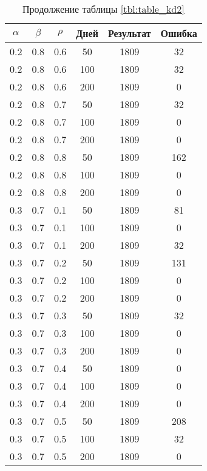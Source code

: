 \begin{table}[h]
	\begin{center}
        \begin{threeparttable}
        \captionsetup{justification=raggedright,singlelinecheck=off}
		\caption*{Продолжение таблицы \ref{tbl:table_kd2}}
		\begin{tabular}{|c|c|c|c|c|c|}
  	\hline
	$\alpha$ & $\beta$ & $\rho$ & Дней & Результат & Ошибка \\\hline
		0.2 &  0.8 &  0.6 &   50 &  1809 &    32 \\
		0.2 &  0.8 &  0.6 &  100 &  1809 &    32 \\
		0.2 &  0.8 &  0.6 &  200 &  1809 &     0 \\
	   \hline
		0.2 &  0.8 &  0.7 &   50 &  1809 &    32 \\
		0.2 &  0.8 &  0.7 &  100 &  1809 &     0 \\
		0.2 &  0.8 &  0.7 &  200 &  1809 &     0 \\
	   \hline
		0.2 &  0.8 &  0.8 &   50 &  1809 &   162 \\
		0.2 &  0.8 &  0.8 &  100 &  1809 &     0 \\
		0.2 &  0.8 &  0.8 &  200 &  1809 &     0 \\
	   \hline
		0.3 &  0.7 &  0.1 &   50 &  1809 &    81 \\
		0.3 &  0.7 &  0.1 &  100 &  1809 &     0 \\
		0.3 &  0.7 &  0.1 &  200 &  1809 &    32 \\
	   \hline
		0.3 &  0.7 &  0.2 &   50 &  1809 &   131 \\
		0.3 &  0.7 &  0.2 &  100 &  1809 &     0 \\
		0.3 &  0.7 &  0.2 &  200 &  1809 &     0 \\
	   \hline
		0.3 &  0.7 &  0.3 &   50 &  1809 &    32 \\
		0.3 &  0.7 &  0.3 &  100 &  1809 &     0 \\
		0.3 &  0.7 &  0.3 &  200 &  1809 &     0 \\
	   \hline
		0.3 &  0.7 &  0.4 &   50 &  1809 &     0 \\
		0.3 &  0.7 &  0.4 &  100 &  1809 &     0 \\
		0.3 &  0.7 &  0.4 &  200 &  1809 &     0 \\
	   \hline
		0.3 &  0.7 &  0.5 &   50 &  1809 &   208 \\
		0.3 &  0.7 &  0.5 &  100 &  1809 &    32 \\
		0.3 &  0.7 &  0.5 &  200 &  1809 &     0 \\

\end{tabular}
\end{threeparttable}
\end{center}
\end{table}
